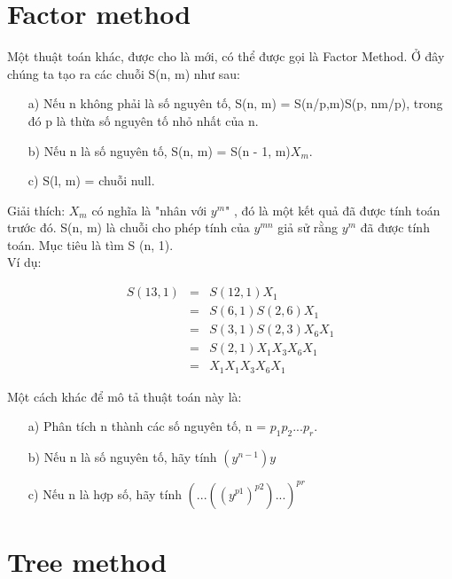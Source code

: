 \documentclass{article}
\begin{document}
\begin{multicols}{3}
\section*{\LARGE Factor method}


\qquad Một thuật toán khác, được cho là mới, có thể được gọi là Factor Method. 
Ở đây chúng ta tạo ra các chuỗi S(n, m) như sau:
  \begin{itemize}
    \item[a)]	Nếu n không phải là số nguyên tố, S(n, m) = S(n/p,m)S(p, nm/p), trong đó p là thừa số nguyên tố nhỏ nhất của n.
    \item[b)]	Nếu n là số nguyên tố, S(n, m) = S(n - 1, m)$X_m$.
    \item[c)]	S(l, m) = chuỗi null.
  \end{itemize}
  \qquad Giải thích: $X_m$ có nghĩa là "nhân với $y^m$" , đó là một kết quả đã được 
  tính toán trước đó.  S(n, m) là chuỗi cho phép tính của $y^{mn}$ giả sử 
  rằng $y^m$ đã được tính toán. Mục tiêu là tìm S (n, 1).\\
  \indent \qquad Ví dụ:
  \begin{center}
    \begin{eqnarray}
      S(13, 1)  & = &S(12, 1)X_1 \\ 
        & = & S(6,1)S(2, 6)X_1 \\  
        & = & S(3,1)S(2, 3)X_6X_1 \\ 
        & = & S(2,1)X_1X_3X_6X_1 \\
        & = & X_1X_1X_3X_6X_1 
    \end{eqnarray}
  \end{center}
  \qquad Một cách khác để mô tả thuật toán này là:
  \begin{itemize}
    \item[a)] Phân tích n thành các số nguyên tố, n = $p_1p_2...p_r.$
    \item[b)] Nếu n là số nguyên tố, hãy tính $(y^{n-1})y$
    \item[c)] Nếu n là hợp số, hãy tính $(...((y^{p1})^{p2})...)^{pr}$
  \end{itemize}
\noindent


\section*{\LARGE Tree method}



\end{multicols}
\end{document}

